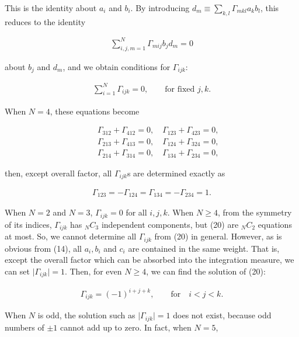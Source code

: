 \documentclass[a4paper,12pt]{article}
\begin{document}
\noindent This is the identity about $a_i$ and $b_i$. By introducing $d_m\! \equiv \! \sum_{k,l}\Gamma_{mkl}a_kb_l$, this reduces to the identity 

\begin{eqnarray}
	\sum_{i,j,m=1}^N \Gamma_{mij}b_jd_m=0
\end{eqnarray}

\noindent about $b_j$ and $d_m$, and we obtain conditions for $\Gamma_{ijk}$: 

\begin{eqnarray}
	\sum_{i=1}^N \Gamma_{ijk}=0, \qquad \text{for fixed }j,k.
\end{eqnarray}

\noindent When $N\! =\! 4$, these equations become 

\begin{eqnarray*}
	& & \Gamma_{312}+\Gamma_{412}=0,\quad \Gamma_{123}+\Gamma_{423}=0, \\
	& & \Gamma_{213}+\Gamma_{413}=0,\quad \Gamma_{124}+\Gamma_{324}=0, \\
	& & \Gamma_{214}+\Gamma_{314}=0,\quad \Gamma_{134}+\Gamma_{234}=0,
\end{eqnarray*}

\noindent then, except overall factor, all $\Gamma_{ijk}$s are determined exactly as 

\begin{eqnarray}
	\Gamma_{123}=-\Gamma_{124}=\Gamma_{134}=-\Gamma_{234}=1.
\end{eqnarray}

\noindent When $N\! =\! 2$ and $N\! =\! 3$, $\Gamma_{ijk}\! =\! 0$ for all $i,j,k$. When $N\! \geq \! 4$, from the symmetry of its indices, $\Gamma_{ijk}$ has ${}_NC_3$ independent components, but (20) are ${}_NC_2$ equations at most. So, we cannot determine all $\Gamma_{ijk}$ from (20) in general. However, as is obvious from (14), all $a_i,b_i$ and $c_i$ are contained in the same weight. That is, except the overall factor which can be absorbed into the integration measure, we can set $\big|\Gamma_{ijk}\big|\! =\! 1$. Then, for even $N\! \geq \! 4$, we can find the solution of (20): 

\begin{eqnarray}
	\Gamma_{ijk}=(-1)^{i+j+k}, \qquad \text{for} \quad i<j<k.
\end{eqnarray}

\noindent When $N$ is odd, the solution such as $\big|\Gamma_{ijk}\big|\! =\! 1$ does not exist, because odd numbers of $\pm 1$ cannot add up to zero. In fact, when $N\! =\! 5$, 
\end{document}
